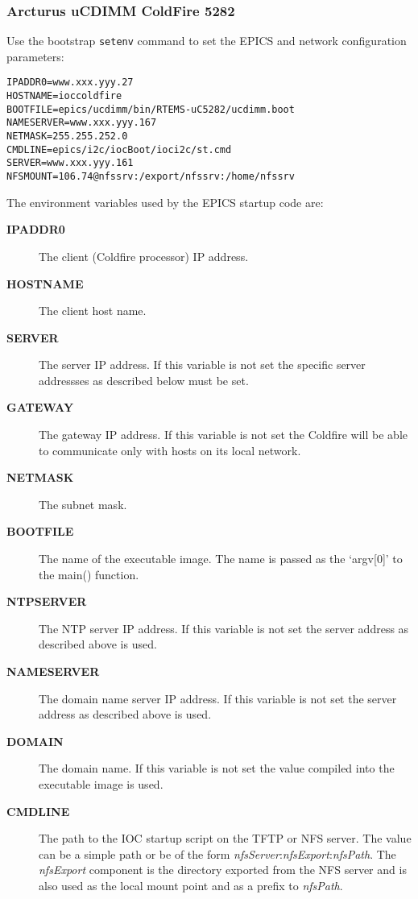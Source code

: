\documentclass{report}
\begin{document}
\subsubsection{Arcturus uCDIMM ColdFire 5282}
Use the bootstrap {\tt setenv} command to set the EPICS and network
configuration parameters:
\begin{verbatim}
IPADDR0=www.xxx.yyy.27
HOSTNAME=ioccoldfire
BOOTFILE=epics/ucdimm/bin/RTEMS-uC5282/ucdimm.boot
NAMESERVER=www.xxx.yyy.167
NETMASK=255.255.252.0
CMDLINE=epics/i2c/iocBoot/ioci2c/st.cmd
SERVER=www.xxx.yyy.161
NFSMOUNT=106.74@nfssrv:/export/nfssrv:/home/nfssrv
\end{verbatim}

The environment variables used by the EPICS startup code are:
\begin{description}
\item[{\bf IPADDR0}]
The client (Coldfire processor) IP address.

\item[{\bf HOSTNAME}]
The client host name.

\item[{\bf SERVER}]
The server IP address.  If this variable is not set the specific server
addressses as described below must be set.

\item[{\bf GATEWAY}]
The gateway IP address.  If this variable is not set the Coldfire will be
able to communicate only with hosts on its local network.

\item[{\bf NETMASK}]
The subnet mask.

\item[{\bf BOOTFILE}]
The name of the executable image.
The name is passed as the `argv[0]' to the main() function.

\item[{\bf NTPSERVER}]
The NTP server IP address.  If this variable is not set the server address as described above is used.

\item[{\bf NAMESERVER}]
The domain name server IP address.  If this variable is not set the server address as described above is used.

\item[{\bf DOMAIN}]
The domain name.  If this variable is not set the value compiled into the executable image is used.

\item[{\bf CMDLINE}]
The path to the IOC startup script on the TFTP or NFS server. 
The value can be a simple path or be of the form
\textit{nfsServer}:\textit{nfsExport}:\textit{nfsPath}.
The \textit{nfsExport} component is the directory exported from the NFS server and is also used as the local mount point and as a prefix to \textit{nfsPath}.


\end{description}
\end{document}
